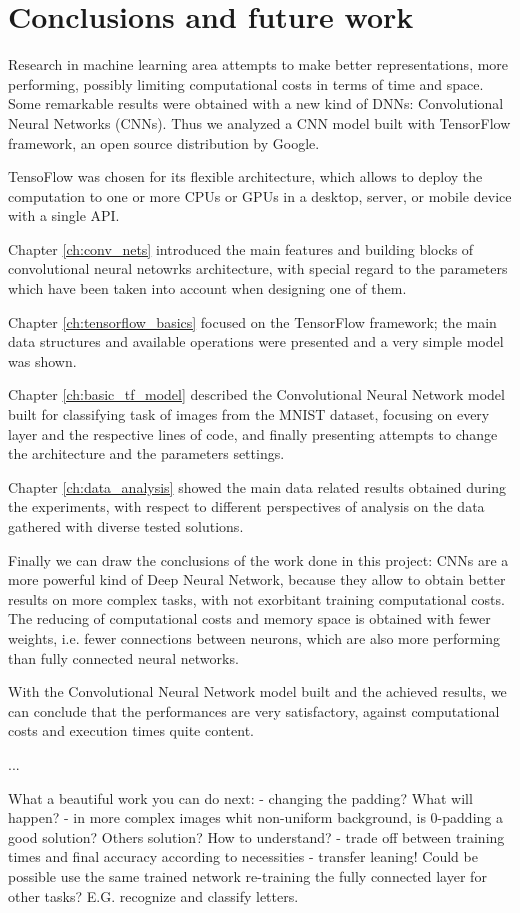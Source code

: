 \chapter{Conclusions and future work}\label{ch:conclusions}

Research in machine learning area attempts to make better representations, more performing, possibly limiting computational costs in terms of time and space. Some remarkable results were obtained with a new kind of \acsp{DNN}: Convolutional Neural Networks (\acsp{CNN}). Thus we analyzed a \acs{CNN} model built with TensorFlow framework, an open source distribution by Google.

TensoFlow was chosen for its flexible architecture, which allows to deploy the computation to one or more \acsp{CPU} or \acsp{GPU} in a desktop, server, or mobile device with a single API.

Chapter \ref{ch:conv_nets} introduced the main features and building blocks of convolutional neural netowrks architecture, with special regard to the parameters which have been taken into account when designing one of them.

Chapter \ref{ch:tensorflow_basics} focused on the TensorFlow framework; the main data structures and available operations were presented and a very simple model was shown.

Chapter \ref{ch:basic_tf_model} described the Convolutional Neural Network model built for classifying task of images from the MNIST dataset, focusing on every layer and the respective lines of code, and finally presenting attempts to change the architecture and the parameters settings.

Chapter \ref{ch:data_analysis} showed the main data related results obtained during the experiments, with respect to different perspectives of analysis on the data gathered with diverse tested solutions.

Finally we can draw the conclusions of the work done in this project: \acsp{CNN} are a more powerful kind of Deep Neural Network, because they allow to obtain better results on more complex tasks, with not exorbitant training computational costs. The reducing of computational costs and memory space is obtained with fewer weights, i.e. fewer connections between neurons, which are also more performing than fully connected neural networks.

With the Convolutional Neural Network model built and the achieved results, we can conclude that the performances are very satisfactory, against computational costs and execution times quite content.

...

What a beautiful work you can do next:
- changing the padding? What will happen?
- in more complex images whit non-uniform background, is 0-padding a good solution? Others solution? How to understand?
- trade off between training times and final accuracy according to necessities
- transfer leaning! Could be possible use the same trained network re-training the fully connected layer for other tasks? E.G. recognize and classify letters.